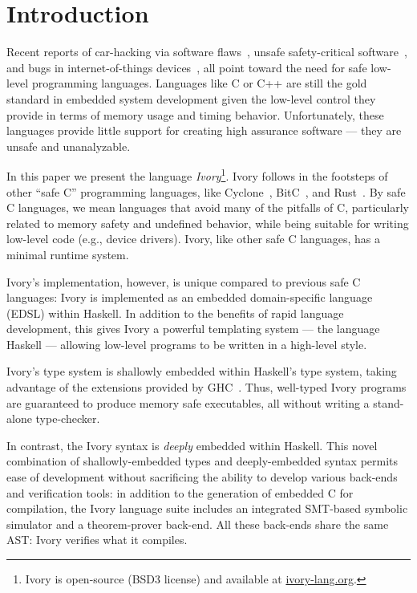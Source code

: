 \section{Introduction}
\label{sec:introduction}

Recent reports of car-hacking via software flaws~\cite{}, unsafe
safety-critical software~\cite{}, and bugs in internet-of-things
devices~\cite{}, all point toward the need for safe low-level programming
languages. Languages like C or C++ are still the gold standard in embedded
system development given the low-level control they provide in terms of memory
usage and timing behavior. Unfortunately, these languages provide
little support for creating high assurance software --- they are
unsafe and unanalyzable.

In this paper we present the language \emph{Ivory}\footnote{%
Ivory is open-source (BSD3 license) and available at \url{ivory-lang.org}.}.
Ivory follows in the
footsteps of other ``safe C'' programming languages, like
Cyclone~\cite{cyclone}, BitC~\cite{bitc}, and Rust~\cite{rust}. By safe C
languages, we mean languages that avoid many of the pitfalls of C, particularly
related to memory safety and undefined behavior, while being suitable for
writing low-level code (e.g., device drivers). Ivory, like other safe C
languages, has a minimal runtime system.

Ivory's implementation, however, is unique compared to previous safe C
languages: Ivory is implemented as an embedded domain-specific
language (EDSL) within Haskell.  In addition to the
benefits of rapid language development, this gives Ivory a powerful
templating system --- the language Haskell --- allowing low-level
programs to be written in a high-level style.

Ivory's type system is shallowly embedded within Haskell's type
system, taking advantage of the extensions provided
by GHC~\cite{dephaskell}.  Thus, well-typed Ivory programs are
guaranteed to produce memory safe executables, all without writing a
stand-alone type-checker.

In contrast, the Ivory syntax is \emph{deeply} embedded within
Haskell.  This novel combination of shallowly-embedded types and
deeply-embedded syntax permits ease of development without sacrificing
the ability to develop various back-ends and verification tools: in
addition to the generation of embedded C for compilation, the Ivory
language suite includes an integrated SMT-based symbolic simulator and
a theorem-prover back-end.  All these back-ends share the same AST:
Ivory verifies what it compiles.

